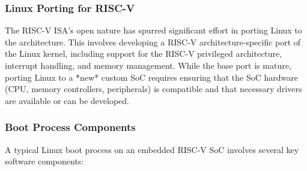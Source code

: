 \subsubsection{Linux Porting for RISC-V}
The RISC-V ISA's open nature has spurred significant effort in porting Linux to the architecture. This involves developing a RISC-V architecture-specific port of the Linux kernel, including support for the RISC-V privileged architecture, interrupt handling, and memory management. While the base port is mature, porting Linux to a *new* custom SoC requires ensuring that the SoC hardware (CPU, memory controllers, peripherals) is compatible and that necessary drivers are available or can be developed.

\subsubsection{Boot Process Components}
A typical Linux boot process on an embedded RISC-V SoC involves several key software components:
